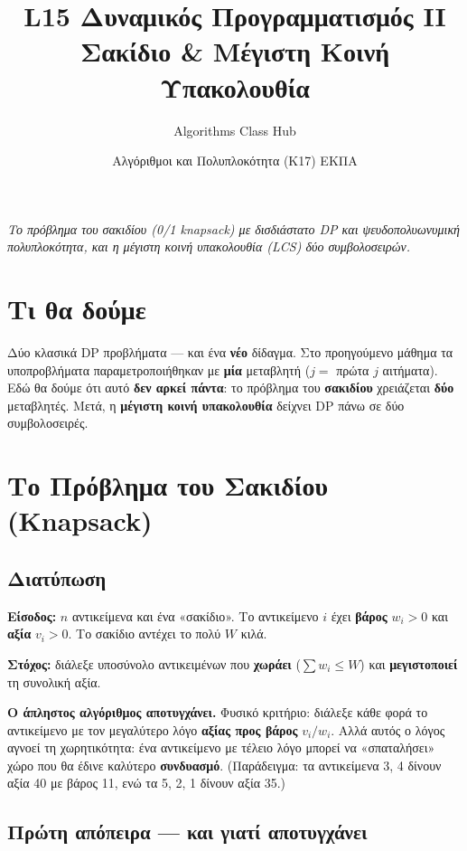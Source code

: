 \documentclass[11pt,a4paper]{article}
\title{\textbf{L15 \textperiodcentered{} Δυναμικός Προγραμματισμός II}\\[2pt]
\large Σακίδιο \& Μέγιστη Κοινή Υπακολουθία}
\author{Algorithms Class Hub}
\date{\small Αλγόριθμοι και Πολυπλοκότητα (K17) \textperiodcentered{} ΕΚΠΑ}
\begin{document}
\maketitle

\begin{center}\itshape\small
Το πρόβλημα του σακιδίου (0/1 knapsack) με δισδιάστατο DP και ψευδοπολυωνυμική
πολυπλοκότητα, και η μέγιστη κοινή υπακολουθία (LCS) δύο συμβολοσειρών.
\end{center}

\section{Τι θα δούμε}

Δύο κλασικά DP προβλήματα --- και ένα \textbf{νέο} δίδαγμα. Στο προηγούμενο
μάθημα τα υποπροβλήματα παραμετροποιήθηκαν με \textbf{μία} μεταβλητή ($j = $
πρώτα $j$ αιτήματα). Εδώ θα δούμε ότι αυτό \textbf{δεν αρκεί πάντα}: το πρόβλημα
του \textbf{σακιδίου} χρειάζεται \textbf{δύο} μεταβλητές. Μετά, η \textbf{μέγιστη
κοινή υπακολουθία} δείχνει DP πάνω σε δύο συμβολοσειρές.

\section{Το Πρόβλημα του Σακιδίου (Knapsack)}

\subsection{Διατύπωση}

\textbf{Είσοδος:} $n$ αντικείμενα και ένα «σακίδιο». Το αντικείμενο $i$ έχει
\textbf{βάρος} $w_i > 0$ και \textbf{αξία} $v_i > 0$. Το σακίδιο αντέχει το πολύ
$W$ κιλά.

\textbf{Στόχος:} διάλεξε υποσύνολο αντικειμένων που \textbf{χωράει}
($\sum w_i \le W$) και \textbf{μεγιστοποιεί} τη συνολική αξία.

\begin{warningbox}
\textbf{Ο άπληστος αλγόριθμος αποτυγχάνει.} Φυσικό κριτήριο: διάλεξε κάθε φορά το
αντικείμενο με τον μεγαλύτερο λόγο \textbf{αξίας προς βάρος} $v_i / w_i$. Αλλά
αυτός ο λόγος αγνοεί τη χωρητικότητα: ένα αντικείμενο με τέλειο λόγο μπορεί να
«σπαταλήσει» χώρο που θα έδινε καλύτερο \textbf{συνδυασμό}. (Παράδειγμα: τα
αντικείμενα 3, 4 δίνουν αξία 40 με βάρος 11, ενώ τα 5, 2, 1 δίνουν αξία 35.)
\end{warningbox}

\subsection{Πρώτη απόπειρα --- και γιατί αποτυγχάνει}
\end{document}
